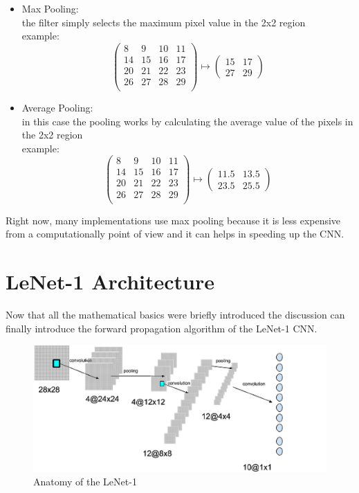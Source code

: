 \documentclass[a4paper]{report}
\begin{document}
\begin{itemize}  
\item Max Pooling: \\
the filter simply selects the maximum pixel value in the 2x2 region\\
example:\\
\[
\left(
\begin{array}{ccccc}
  8&  9&  10&  11 \\
  14& 15& 16& 17  \\
  20& 21& 22& 23 \\
  26& 27& 28& 29 \\
\end{array}
\right)
\mapsto
\left(
\begin{array}{cc}
  15&  17  \\
  27& 29
\end{array}
\right)
\]
\item Average Pooling: \\
in this case the pooling works by calculating the average value of the pixels in the 2x2 region\\
example:\\
\[
\left(
\begin{array}{ccccc}
  8&  9&  10&  11 \\
  14& 15& 16& 17  \\
  20& 21& 22& 23 \\
  26& 27& 28& 29 \\
\end{array}
\right)
\mapsto
\left(
\begin{array}{cc}
  11.5&  13.5  \\
  23.5& 25.5
\end{array}
\right)
\]
\end{itemize}

Right now, many implementations use max pooling because it is less expensive from a computationally point of view and it can helps in speeding up the CNN.


\section{LeNet-1 Architecture}
Now that all the mathematical basics were briefly introduced the discussion can finally introduce the forward propagation algorithm of the LeNet-1 CNN.\\
\begin{figure}[!h]
\centering
\includegraphics[width=0.8\columnwidth]{docs/LeNet1.png} 
\caption{Anatomy of the LeNet-1}
\label{fig_lenet}
\end{figure}
\end{document}
